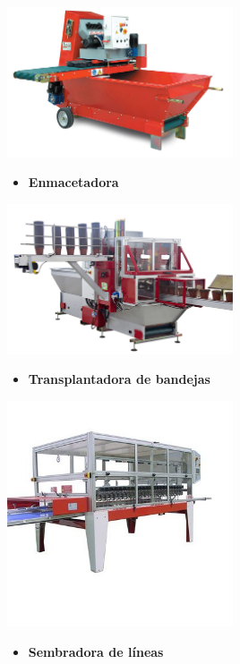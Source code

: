 \documentclass[a4paper,12pt,oneside]{article}
\begin{document}
\begin{center}
\includegraphics[width=0.5\textwidth]{./img_uf1596/bandejas_mezcladora.jpg}
\end{center} 
\begin{itemize}
\item \textbf{Enmacetadora}
\end{itemize}
\begin{center}
\includegraphics[width=0.5\textwidth]{./img_uf1596/enmacetadora.jpg}
\end{center}
\newpage
\begin{itemize}
\item \textbf{Transplantadora de bandejas}
\end{itemize}
\begin{center}
\includegraphics[width=0.5\textwidth]{./img_uf1596/transplantadora_bandejas.jpg}
\end{center}
\begin{itemize}
\item \textbf{Sembradora de líneas}
\end{itemize}
\end{document}
